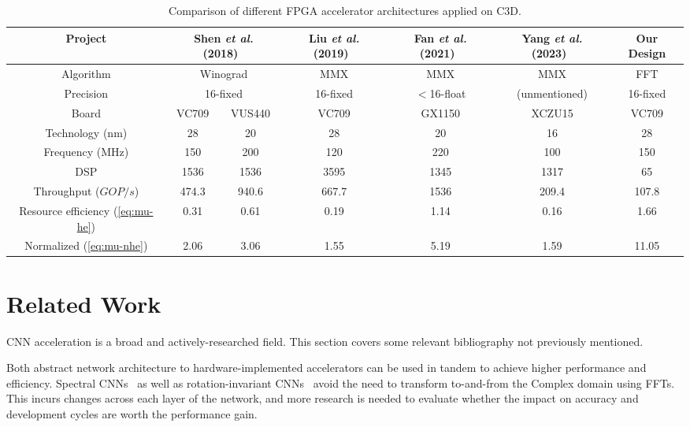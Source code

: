 \documentclass[
  10pt,
  \FORMAT-MODE,
  \REVIEW-MODE,
  \TWOSIDE-MODE
]{IEEEtran}
\let\MYoriglatexcaption\caption
\renewcommand{\caption}[2][\relax]{\MYoriglatexcaption[#2]{#2}}
\begin{document}
  \begin{table}
    \caption{Comparison of different FPGA accelerator architectures applied on C3D.}
    \centering
    \label{tab:he-comp}
    \begin{tabular}{|c|c|c|c|c|c|c|}
      \hline
      Project &
        \multicolumn{2}{c|}{Shen \textit{et al.} (2018)~\cite{shen2018towards}} &
        Liu \textit{et al.} (2019)~\cite{liu2019uniform} &
        Fan \textit{et al.} (2021)~\cite{fan2021high} &
        Yang \textit{et al.} (2023)~\cite{yang2023fgpa} &
        Our Design\\\hline
      Algorithm    & \multicolumn{2}{c|}{Winograd} & MMX      & MMX         & MMX    & FFT    \\\hline
      Precision    & \multicolumn{2}{c|}{16-fixed} & 16-fixed & $<$16-float & (unmentioned)   & 16-fixed \\\hline
      Board                       & VC709 & VUS440 & VC709    & GX1150      & XCZU15 & VC709  \\\hline
      Technology (nm)             & 28    & 20     & 28       & 20          & 16     & 28     \\\hline
      Frequency (MHz)             & 150   & 200    & 120      & 220         & 100    & 150    \\\hline
      DSP                         & 1536  & 1536   & 3595     & 1345        & 1317   & 65     \\\hline
      Throughput ($GOP/s$)        & 474.3 & 940.6  & 667.7    & 1536        & 209.4  & 107.8  \\\hline
      Resource efficiency (\ref{eq:mu-he})
        &                           0.31  & 0.61   & 0.19     & 1.14        & 0.16   & 1.66   \\
      Normalized (\ref{eq:mu-nhe})
        &                           2.06  & 3.06   & 1.55     & 5.19        & 1.59   & 11.05  \\\hline
    \end{tabular}
  \end{table}

\section{Related Work}\label{sec:rela}
  CNN acceleration is a broad and actively-researched field. This section covers some relevant bibliography not previously mentioned.
  
  Both abstract network architecture to hardware-implemented accelerators can be used in tandem to achieve higher performance and efficiency. Spectral CNNs~\cite{pratt2017fcnn,liu2021accelerating,ayat2019spectral,han2021deep,watanabe2021image} as well as rotation-invariant CNNs~\cite{kim2020cycnn,mo2024ric} avoid the need to transform to-and-from the Complex domain using FFTs. This incurs changes across each layer of the network, and more research is needed to evaluate whether the impact on accuracy and development cycles are worth the performance gain.
\end{document}
